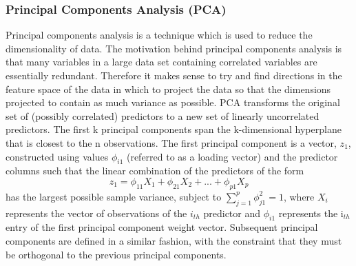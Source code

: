 \subsubsection{Principal Components Analysis (PCA)}
Principal components analysis is a technique which is used to reduce the dimensionality of data. The motivation behind principal components analysis is that many variables in a large data set containing correlated variables are essentially redundant. Therefore it makes sense to try and find directions in the feature space of the data in which to project the data so that the dimensions projected to contain as much variance as possible. PCA transforms the original set of (possibly correlated) predictors to a new set of linearly uncorrelated predictors. The first k principal components span the k-dimensional hyperplane that is closest to the n observations. The first principal component is a vector, $z_1$, constructed using values $\phi_{i1}$ (referred to as a loading vector) and the predictor columns such that the linear combination of the predictors of the form 
\[z_{1}=\phi_{11}X_{1}+\phi_{21}X_{2}+...+\phi_{p1}X_{p}\]
has the largest possible sample variance, subject to $\sum_{j=1}^{p} \phi_{j1}^2=1$, where $X_{i}$ represents the vector of observations of the $i_{th}$ predictor and $\phi_{i1}$ represents the i$_{th}$ entry of the first principal component weight vector. Subsequent principal components are defined in a similar fashion, with the constraint that they must be orthogonal to the previous principal components.

